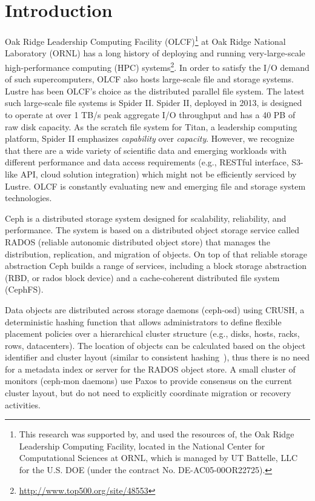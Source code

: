 \section{Introduction}

Oak Ridge Leadership Computing Facility (OLCF)\footnote{This research was
supported by, and used the resources of, the Oak Ridge Leadership Computing
Facility, located in the National Center for Computational Sciences at ORNL,
which is managed by UT Battelle, LLC for the U.S. DOE (under the contract No.
DE-AC05-00OR22725).} at Oak Ridge National Laboratory (ORNL) has a long history
of deploying and running very-large-scale high-performance computing (HPC)
systems\footnote{\url{http://www.top500.org/site/48553}}. 
In order to satisfy the I/O demand of such supercomputers, OLCF
also hosts large-scale file and storage systems. Lustre has been OLCF's choice
as the distributed parallel file system.  The latest such
large-scale file systems is Spider II\cite{spider2}.  Spider II, deployed in
2013, is designed to operate at over 1 TB/s peak aggregate I/O throughput and
has a 40 PB of raw disk capacity. As the scratch 
file system for Titan, a leadership computing platform,
Spider II emphasizes \textit{capability} over \textit{capacity}. However, we
recognize that there are a wide variety of scientific data and emerging
workloads with different performance and data access requirements (e.g., RESTful
interface, S3-like API, cloud solution integration) which might not be
efficiently serviced by Lustre. OLCF is constantly evaluating new and emerging
file and storage system technologies.  

Ceph\cite{Weil:2006:Ceph} is a distributed storage system designed for
scalability, reliability, and performance.  The system is based on a
distributed object storage service called RADOS (reliable autonomic distributed
object store) that manages the distribution, replication, and migration of
objects.  On top of that reliable storage abstraction Ceph builds a range of
services, including a block storage abstraction (RBD, or rados block device)
and a cache-coherent distributed file system (CephFS).

Data objects are distributed across storage daemons (ceph-osd) using
CRUSH\cite{Weil:2006:Crush}, a deterministic hashing function that allows
administrators to define flexible placement policies over a hierarchical
cluster structure (e.g., disks, hosts, racks, rows, datacenters).  The
location of objects can be calculated based on the object identifier and
cluster layout (similar to consistent hashing~\cite{karger1997consistent}),
thus there is no need for a metadata index or server for the RADOS object store.
A small cluster of monitors (ceph-mon daemons) use Paxos to provide consensus on
the current cluster layout, but do not need to explicitly coordinate migration
or recovery activities.

